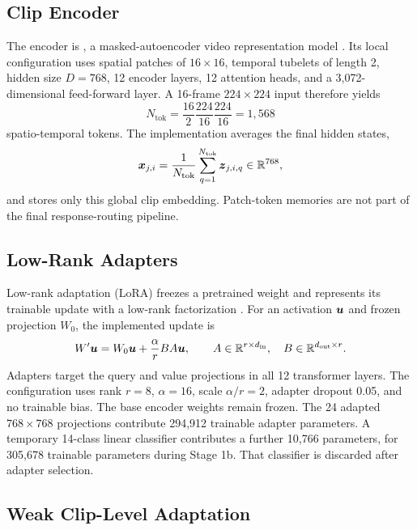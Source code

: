\subsection{Clip Encoder}

The encoder is , a masked-autoencoder video representation model \cite{tong2022videomae}. Its local configuration uses spatial patches of $16\times16$, temporal tubelets of length 2, hidden size $D=768$, 12 encoder layers, 12 attention heads, and a 3,072-dimensional feed-forward layer. A 16-frame $224\times224$ input therefore yields
\begin{equation}
    N_{\mathrm{tok}}
    =\frac{16}{2}\frac{224}{16}\frac{224}{16}
    =1{,}568
\end{equation}
spatio-temporal tokens. The implementation averages the final hidden states,
\begin{equation}
    \boldsymbol{x}_{j,i}
    =\frac{1}{N_{\mathrm{tok}}}\sum_{q=1}^{N_{\mathrm{tok}}}\boldsymbol{z}_{j,i,q}
    \in\mathbb{R}^{768},
    \label{eq:global-embedding}
\end{equation}
and stores only this global clip embedding. Patch-token memories are not part of the final response-routing pipeline.

\subsection{Low-Rank Adapters}

Low-rank adaptation (LoRA) freezes a pretrained weight and represents its trainable update with a low-rank factorization \cite{hu2021lora}. For an activation $\boldsymbol{u}$ and frozen projection $W_0$, the implemented update is
\begin{equation}
    W'\boldsymbol{u}=W_0\boldsymbol{u}+\frac{\alpha}{r}BA\boldsymbol{u},
    \qquad
    A\in\mathbb{R}^{r\times d_{\mathrm{in}}},\quad
    B\in\mathbb{R}^{d_{\mathrm{out}}\times r}.
    \label{eq:lora}
\end{equation}
Adapters target the query and value projections in all 12 transformer layers. The configuration uses rank $r=8$, $\alpha=16$, scale $\alpha/r=2$, adapter dropout 0.05, and no trainable bias. The base encoder weights remain frozen. The 24 adapted $768\times768$ projections contribute 294,912 trainable adapter parameters. A temporary 14-class linear classifier contributes a further 10,766 parameters, for 305,678 trainable parameters during Stage 1b. That classifier is discarded after adapter selection.

\subsection{Weak Clip-Level Adaptation}

